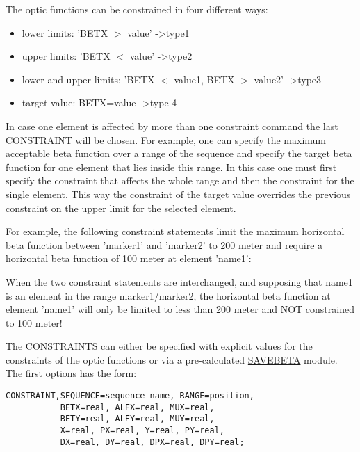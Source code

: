 The optic functions can be constrained in four different ways: 
\begin{itemize}
	\item lower limits: 'BETX $>$ value' -\textgreater type1 
	\item upper limits: 'BETX $<$ value' -\textgreater type2 
	\item lower and upper limits: 'BETX $<$ value1, 
          BETX $>$ value2' -\textgreater type3  
	\item target value: BETX=value -\textgreater type 4 
\end{itemize} 

In case one element is affected by more than one constraint command the
last CONSTRAINT will be chosen. For example, one can specify the
maximum acceptable beta function over a range of the sequence and
specify the target beta function for one element that lies inside this
range. In this case one must first specify the constraint that affects
the whole range and then the constraint for the single element. This way
the constraint of the target value overrides the previous constraint on
the upper limit for the selected element. 

For example, the following
constraint statements limit the maximum horizontal beta function between
'marker1' and 'marker2' to 200 meter and require a horizontal beta
function of 100 meter at element 'name1':  

When the two constraint statements are interchanged, and supposing that
name1 is an element in the range marker1/marker2, the horizontal beta 
function at element 'name1' will only be limited to less than 200 meter
and NOT constrained to 100 meter! 

The CONSTRAINTS can either be specified with explicit values for the
constraints of the optic functions or via a pre-calculated
\href{../control/general.html#savebeta}{SAVEBETA} module. The first
options has the form: 
\begin{verbatim}
CONSTRAINT,SEQUENCE=sequence-name, RANGE=position,
           BETX=real, ALFX=real, MUX=real,                                            
           BETY=real, ALFY=real, MUY=real,
           X=real, PX=real, Y=real, PY=real,
           DX=real, DY=real, DPX=real, DPY=real;

\end{verbatim}

